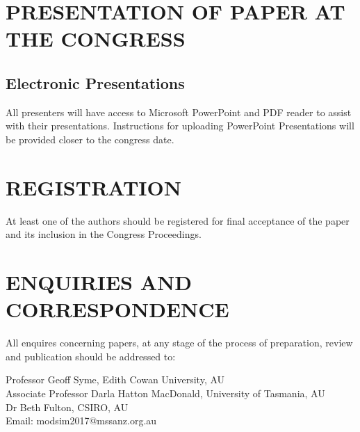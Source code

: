 \documentclass[a4paper,fleqn]{article} %
\begin{document}
\section{PRESENTATION OF PAPER AT THE CONGRESS}

\subsection{Electronic Presentations}
All presenters will have access to Microsoft PowerPoint and PDF reader to assist with their presentations. Instructions for uploading PowerPoint Presentations will be provided closer to the congress date.


\section{REGISTRATION}

At least one of the authors should be registered for final acceptance of the paper and its inclusion in the Congress Proceedings.

\section{ENQUIRIES AND CORRESPONDENCE}
All enquires concerning papers, at any stage of the process of preparation, review and publication should be addressed to: \par

Professor Geoff Syme, Edith Cowan University, AU\\
Associate Professor Darla Hatton MacDonald, University of Tasmania, AU\\
Dr Beth Fulton, CSIRO, AU\\ 
Email: modsim2017@mssanz.org.au\\
	
\end{document}
